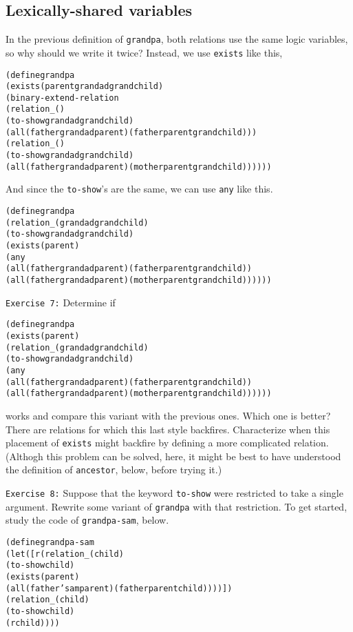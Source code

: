 \subsection{Lexically-shared variables}
In the previous definition of \texttt{grandpa}, both relations use the
same logic variables, so why should we write it twice?
Instead, we use \texttt{exists} like this,
\begin{alltt}
(define grandpa
  (exists (parent grandad grandchild)
    (binary-extend-relation
      (relation _ ()
        (to-show grandad grandchild)
        (all (father grandad parent) (father parent grandchild)))
      (relation _ ()
        (to-show grandad grandchild)
        (all (father grandad parent) (mother parent grandchild))))))
\end{alltt}

And since the \texttt{to-show}'s are the same, we can use \texttt{any}
like this.

\begin{alltt}
(define grandpa
  (relation _ (grandad grandchild)
    (to-show grandad grandchild)
    (exists (parent)
      (any
        (all (father grandad parent) (father parent grandchild))
        (all (father grandad parent) (mother parent grandchild))))))
\end{alltt}
\newpage
\texttt{Exercise 7:}
Determine if 
\begin{alltt}
(define grandpa
  (exists (parent)
    (relation _ (grandad grandchild)
    (to-show grandad grandchild)
      (any
        (all (father grandad parent) (father parent grandchild))
        (all (father grandad parent) (mother parent grandchild))))))
\end{alltt}
works and compare this variant with the previous ones.  Which one is
better?  There are relations for which this last style backfires.
Characterize when this placement of \texttt{exists} might backfire
by defining a more complicated relation.  (Althogh this problem can
be solved, here, it might be best to have understood the definition
of \texttt{ancestor}, below, before trying it.)

\texttt{Exercise 8:} Suppose that the keyword \texttt{to-show} were
restricted to take a single argument.  Rewrite some variant of
\texttt{grandpa} with that restriction.  To get started, study the code
of \texttt{grandpa-sam}, below.

\begin{alltt}
(define grandpa-sam
  (let ([r (relation _ (child)
             (to-show child)
             (exists (parent)
               (all (father 'sam parent) (father parent child))))])
    (relation _ (child)
      (to-show child)
      (r child))))
\end{alltt}


